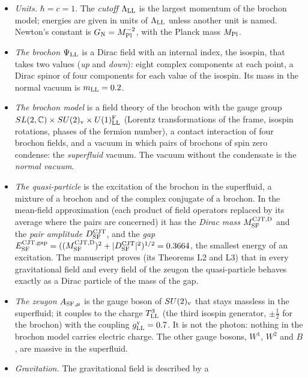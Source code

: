 \documentclass[
  10pt,
]{article}
\providecommand{\tightlist}{%
  \setlength{\itemsep}{0pt}\setlength{\parskip}{0pt}}
\begin{document}
\begin{itemize}
\tightlist
\item
  \emph{Units.} \(\hbar=c=1\). The \emph{cutoff} \(\Lambda_{\rm LL}\) is
  the largest momentum of the brochon model; energies are given in units
  of \(\Lambda_{\rm LL}\) unless another unit is named. Newton's
  constant is \(G_{\rm N}=M_{\rm Pl}^{-2}\), with the Planck mass
  \(M_{\rm Pl}\).
\item
  \emph{The brochon} \(\Psi_{\rm LL}\) is a Dirac field with an internal
  index, the isospin, that takes two values (\emph{up} and \emph{down}):
  eight complex components at each point, a Dirac spinor of four
  components for each value of the isospin. Its mass in the normal
  vacuum is \(m_{\rm LL}=0.2\).
\item
  \emph{The brochon model} is a field theory of the brochon with the
  gauge group
  \(SL(2,\mathbb C)\times SU(2)_{\rm v}\times U(1)^{\rm F}_{\rm LL}\)
  (Lorentz transformations of the frame, isospin rotations, phases of
  the fermion number), a contact interaction of four brochon fields, and
  a vacuum in which pairs of brochons of spin zero condense: the
  \emph{superfluid} vacuum. The vacuum without the condensate is the
  \emph{normal vacuum}.
\item
  \emph{The quasi-particle} is the excitation of the brochon in the
  superfluid, a mixture of a brochon and of the complex conjugate of a
  brochon. In the mean-field approximation (each product of field
  operators replaced by its average where the pairs are concerned) it
  has the \emph{Dirac mass} \(M^{\rm CJT,D}_{\rm SF}\) and the
  \emph{pair amplitude} \(D^{\rm CJT}_{\rm SF}\), and the \emph{gap}
  \(E^{\rm CJT,gap}_{\rm SF}=((M^{\rm CJT,D}_{\rm SF})^2+\lvert D^{\rm CJT}_{\rm SF}\rvert^2)^{1/2}=0.3664\),
  the smallest energy of an excitation. The manuscript proves (its
  Theorems L2 and L3) that in every gravitational field and every field
  of the zeugon the quasi-particle behaves exactly as a Dirac particle
  of the mass of the gap.
\item
  \emph{The zeugon} \(A_{{\rm SF},\mu}\) is the gauge boson of
  \(SU(2)_{\rm v}\) that stays massless in the superfluid; it couples to
  the charge \(T^3_{\rm LL}\) (the third isospin generator,
  \(\pm\tfrac12\) for the brochon) with the coupling
  \(g^{\rm v}_{\rm LL}=0.7\). It is not the photon: nothing in the
  brochon model carries electric charge. The other gauge bosons,
  \(W^1\), \(W^2\) and \(B\), are massive in the superfluid.
\item
  \emph{Gravitation.} The gravitational field is described by a

\end{itemize}
\end{document}
